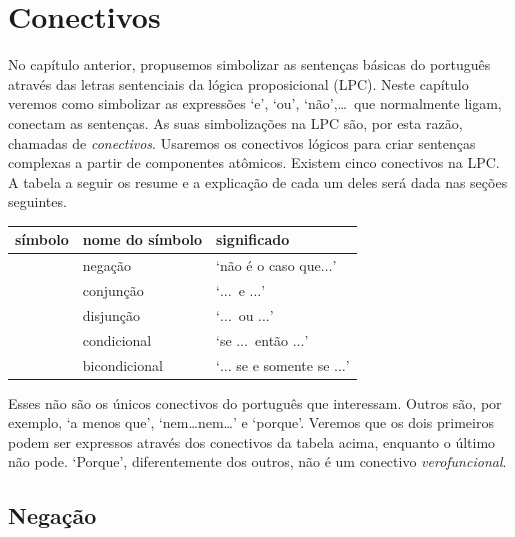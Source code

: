 \chapter{Conectivos}
\label{s:TFLConnectives}

No capítulo anterior, propusemos simbolizar as sentenças básicas do português através das letras sentenciais da lógica proposicional (LPC).
Neste capítulo veremos como simbolizar as expressões `e', `ou', `não',\ldots\ 
que normalmente ligam, conectam as sentenças.
As suas simbolizações na LPC são, por esta razão, chamadas de \emph{conectivos}.
Usaremos os conectivos lógicos para criar sentenças complexas a partir de componentes atômicos. Existem cinco conectivos na LPC.
A tabela a seguir os resume e a explicação de cada um deles será dada nas seções seguintes.

	\begin{table}[h]
	\center
	\begin{tabular}{l l l}
	
	\textbf{símbolo}&\textbf{nome do símbolo}&\textbf{significado}\\
	\hline
	\enot&negação&`não é o caso que$\ldots$'\\
	\eand&conjunção&`$\ldots$\ e $\ldots$'\\
	\eor&disjunção&`$\ldots$\ ou $\ldots$'\\
	\eif&condicional&`se $\ldots$\ então $\ldots$'\\
	\eiff&bicondicional&`$\ldots$ se e somente se $\ldots$'\\
	
	\end{tabular}
	\label{table:TFLConnectives}
	\end{table}

Esses não são os únicos conectivos do português que interessam.
Outros são, por exemplo, `a menos que', `nem\ldots{}nem\ldots' e `porque'.
Veremos que os dois primeiros podem ser expressos através dos conectivos da tabela acima, enquanto o último não pode.
`Porque', diferentemente dos outros, não é um conectivo \emph{verofuncional}.
        
\section{Negação}

